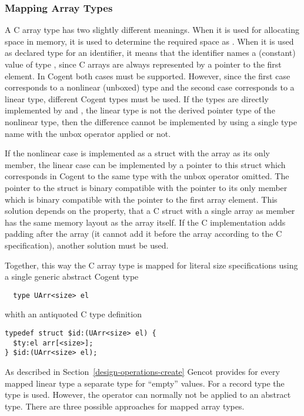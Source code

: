 \subsubsection{Mapping Array Types}

A C array type  has two slightly different meanings. When it is used for allocating space in memory,
it is used to determine the required space as . When it is used as declared type for an 
identifier, it means that the identifier names a (constant) value of type , since C arrays are 
always represented by a pointer to the first element. In Cogent both cases must be supported. However, since 
the first case corresponds to a nonlinear (unboxed) type and the second case corresponds to a linear type, 
different Cogent types must be used. If the types are directly implemented by  and , the 
linear type is not the derived pointer type of the nonlinear type, then the difference cannot be implemented 
by using a single type name with the unbox operator applied or not.

If the nonlinear case is implemented as a struct with the array as its only member, the
linear case can be implemented by a pointer to this struct which corresponds in Cogent to the same type
with the unbox operator omitted. The pointer to the struct is binary compatible with the pointer to its
only member which is binary compatible with the pointer to the first array element. 
This solution depends on the property, that a C struct with a single array as member has the same memory
layout as the array itself. If the C implementation adds padding after the array (it
cannot add it before the array according to the C specification), another solution must be used.

Together, this way the C array type is mapped for literal size specifications using a single generic abstract Cogent type
\begin{verbatim}
  type UArr<size> el
\end{verbatim}
whith an antiquoted C type definition 
\begin{verbatim}
typedef struct $id:(UArr<size> el) {
  $ty:el arr[<size>];
} $id:(UArr<size> el);
\end{verbatim}

As described in Section~\ref{design-operations-create} Gencot provides for every mapped linear type a separate type
for ``empty'' values. For a record type  the type  is used. However, the 
 operator can normally not be applied to an abstract type. There are three possible approaches for mapped 
array types.

